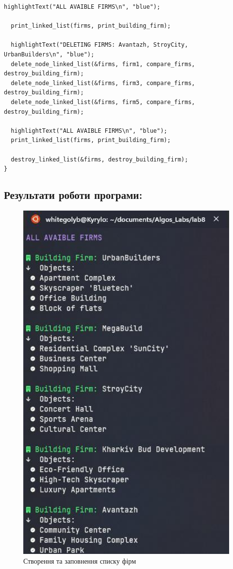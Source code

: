 \begin{lstlisting}[style=customc]
  highlightText("ALL AVAIBLE FIRMS\n", "blue");

  print_linked_list(firms, print_building_firm);

  highlightText("DELETING FIRMS: Avantazh, StroyCity, UrbanBuilders\n", "blue");
  delete_node_linked_list(&firms, firm1, compare_firms, destroy_building_firm);
  delete_node_linked_list(&firms, firm3, compare_firms, destroy_building_firm);
  delete_node_linked_list(&firms, firm5, compare_firms, destroy_building_firm);

  highlightText("ALL AVAIBLE FIRMS\n", "blue");
  print_linked_list(firms, print_building_firm);

  destroy_linked_list(&firms, destroy_building_firm);
}
\end{lstlisting}


\clearpage
\subsection{Результати роботи програми:}

\begin{figure}[h!]
    \centering
    \includegraphics[width=13cm]{reports/algos/lab8/assets/1.jpeg}
    \caption{Створення та заповнення списку фірм}
\end{figure}


